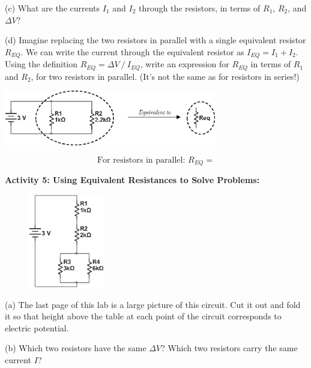 (c) What are the currents $I_1$ and $I_2$ through the resistors, in terms of $R_1$, $R_2$, and  $\Delta V$? 
\vspace{0.6in}

(d) Imagine replacing the two resistors in parallel with a single equivalent resistor $R_{EQ}$.   We can write the current through the equivalent resistor as $I_{EQ}=I_1+I_2$.  Using the definition $R_{EQ}=  \Delta V ⁄ I_{EQ}$, write an expression for $R_{EQ}$ in terms of $R_1$ and $R_2$, for two resistors in parallel.  (It's not the same as for resistors in series!)

\begin{center}
\includegraphics[width=0.7\textwidth]{electric_circuits2/parallel_equiv_bw.eps}
\vspace{1 in}
\end{center}

\begin{displaymath}
\textrm{For resistors in parallel: } R_{EQ} = 
\end{displaymath}

\textbf{Activity 5: Using Equivalent Resistances to Solve Problems:}

\begin{figure}
    \vspace{-0.4 in}
    \includegraphics[width=0.3\textwidth]{electric_circuits2/circ_diag6_bw.eps}
\end{figure}

(a) The last page of this lab is a large picture of this circuit.  Cut it out and fold it so that height above the table at each point of the circuit corresponds to electric potential.  

(b) Which two resistors have the same $\Delta V$?  Which two resistors carry the same current $I$?
\vspace {0.6 in}

